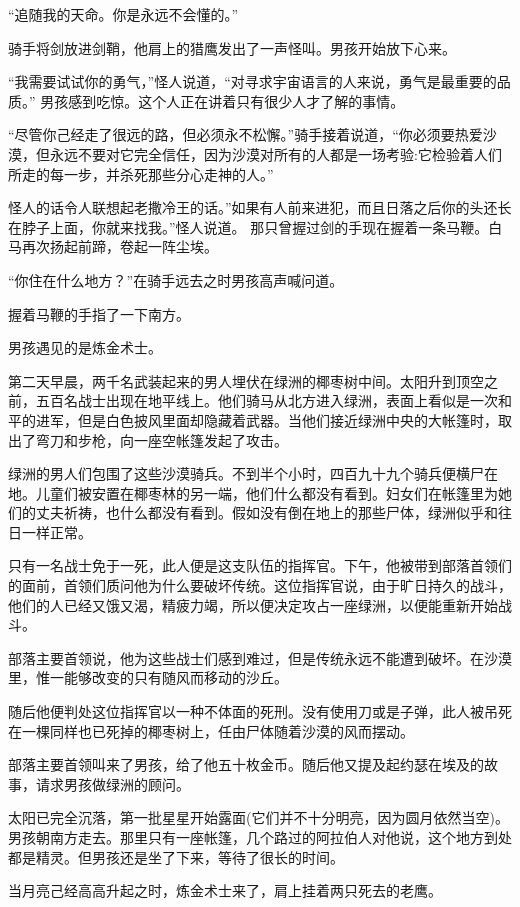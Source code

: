 \documentclass[twoside,openany]{book}
\begin{document}
“追随我的天命。你是永远不会懂的。”

骑手将剑放进剑鞘，他肩上的猎鹰发出了一声怪叫。男孩开始放下心来。

“我需要试试你的勇气，”怪人说道，“对寻求宇宙语言的人来说，勇气是最重要的品质。” 男孩感到吃惊。这个人正在讲着只有很少人才了解的事情。

“尽管你己经走了很远的路，但必须永不松懈。”骑手接着说道，“你必须要热爱沙漠，但永远不要对它完全信任，因为沙漠对所有的人都是一场考验:它检验着人们所走的每一步，并杀死那些分心走神的人。”

怪人的话令人联想起老撒冷王的话。”如果有人前来进犯，而且日落之后你的头还长在脖子上面，你就来找我。”怪人说道。 那只曾握过剑的手现在握着一条马鞭。白马再次扬起前蹄，卷起一阵尘埃。

“你住在什么地方？”在骑手远去之时男孩高声喊问道。

握着马鞭的手指了一下南方。

男孩遇见的是炼金术士。

第二天早晨，两千名武装起来的男人埋伏在绿洲的椰枣树中间。太阳升到顶空之前，五百名战士出现在地平线上。他们骑马从北方进入绿洲，表面上看似是一次和平的进军，但是白色披风里面却隐藏着武器。当他们接近绿洲中央的大帐篷时，取出了弯刀和步枪，向一座空帐篷发起了攻击。

绿洲的男人们包围了这些沙漠骑兵。不到半个小时，四百九十九个骑兵便横尸在地。儿童们被安置在椰枣林的另一端，他们什么都没有看到。妇女们在帐篷里为她们的丈夫祈祷，也什么都没有看到。假如没有倒在地上的那些尸体，绿洲似乎和往日一样正常。

只有一名战士免于一死，此人便是这支队伍的指挥官。下午，他被带到部落首领们的面前，首领们质问他为什么要破坏传统。这位指挥官说，由于旷日持久的战斗，他们的人已经又饿又渴，精疲力竭，所以便决定攻占一座绿洲，以便能重新开始战斗。

部落主要首领说，他为这些战士们感到难过，但是传统永远不能遭到破坏。在沙漠里，惟一能够改变的只有随风而移动的沙丘。

随后他便判处这位指挥官以一种不体面的死刑。没有使用刀或是子弹，此人被吊死在一棵同样也已死掉的椰枣树上，任由尸体随着沙漠的风而摆动。

部落主要首领叫来了男孩，给了他五十枚金币。随后他又提及起约瑟在埃及的故事，请求男孩做绿洲的顾问。

太阳已完全沉落，第一批星星开始露面(它们并不十分明亮，因为圆月依然当空)。男孩朝南方走去。那里只有一座帐篷，几个路过的阿拉伯人对他说，这个地方到处都是精灵。但男孩还是坐了下来，等待了很长的时间。

当月亮己经高高升起之时，炼金术士来了，肩上挂着两只死去的老鹰。
\end{document}
